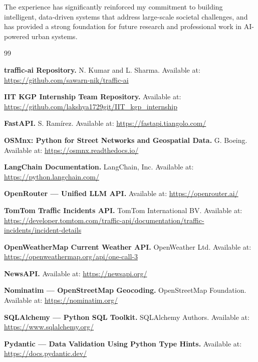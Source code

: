 \documentclass[12pt, a4paper]{report}
\begin{document}
The experience has significantly reinforced my commitment to building intelligent, data-driven systems that address large-scale societal challenges, and has provided a strong foundation for future research and professional work in AI-powered urban systems.

\clearpage

\begin{thebibliography}{99}

    \textbf{traffic-ai Repository.} N. Kumar and L. Sharma.
    Available at: \url{https://github.com/sawarn-nik/traffic-ai}

    \textbf{IIT KGP Internship Team Repository.} Available at:
    \url{https://github.com/lakshya1729git/IIT_kgp_internship}

    \textbf{FastAPI.} S. Ram\'irez. Available at: \url{https://fastapi.tiangolo.com/}

    \textbf{OSMnx: Python for Street Networks and Geospatial Data.}
    G. Boeing. Available at: \url{https://osmnx.readthedocs.io/}

    \textbf{LangChain Documentation.} LangChain, Inc.
    Available at: \url{https://python.langchain.com/}

    \textbf{OpenRouter — Unified LLM API.}
    Available at: \url{https://openrouter.ai/}

    \textbf{TomTom Traffic Incidents API.} TomTom International BV.
    Available at: \url{https://developer.tomtom.com/traffic-api/documentation/traffic-incidents/incident-details}

    \textbf{OpenWeatherMap Current Weather API.} OpenWeather Ltd.
    Available at: \url{https://openweathermap.org/api/one-call-3}

    \textbf{NewsAPI.} Available at: \url{https://newsapi.org/}

    \textbf{Nominatim — OpenStreetMap Geocoding.} OpenStreetMap Foundation.
    Available at: \url{https://nominatim.org/}

    \textbf{SQLAlchemy — Python SQL Toolkit.} SQLAlchemy Authors.
    Available at: \url{https://www.sqlalchemy.org/}

    \textbf{Pydantic — Data Validation Using Python Type Hints.}
    Available at: \url{https://docs.pydantic.dev/}


\end{thebibliography}
\end{document}
